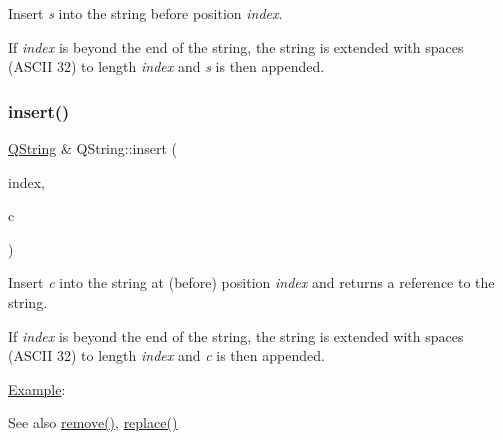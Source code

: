Insert {\itshape s} into the string before position {\itshape index}.

If {\itshape index} is beyond the end of the string, the string is extended with spaces (A\+S\+C\+II 32) to length {\itshape index} and {\itshape s} is then appended.


\begin{DoxyCode}{0}
\end{DoxyCode}
 \mbox{\label{class_q_string_add1ccd76184e93c88d2941cf6e5cd22e}} 
\subsubsection{\texorpdfstring{insert()}{insert()}\hspace{0.1cm}{\footnotesize\ttfamily [4/4]}}
{\footnotesize\ttfamily \mbox{\hyperlink{class_q_string}{Q\+String}} \& Q\+String\+::insert (\begin{DoxyParamCaption}\item[{uint}]{index,  }\item[{\mbox{\hyperlink{class_q_char}{Q\+Char}}}]{c }\end{DoxyParamCaption})}

Insert {\itshape c} into the string at (before) position {\itshape index} and returns a reference to the string.

If {\itshape index} is beyond the end of the string, the string is extended with spaces (A\+S\+C\+II 32) to length {\itshape index} and {\itshape c} is then appended.

\mbox{\hyperlink{struct_example}{Example}}\+: 
\begin{DoxyCode}{0}
\end{DoxyCode}


\begin{DoxySeeAlso}{See also}
\mbox{\hyperlink{class_q_string_afd08aabf1d9b04a3fef298290af04cbd}{remove()}}, \mbox{\hyperlink{class_q_string_aa785aa8e254ae8704f1a960245f3337e}{replace()}} 
\end{DoxySeeAlso}
\mbox{\label{class_q_string_aa032d4b5892338beb575a85e59bbbf38}} 
